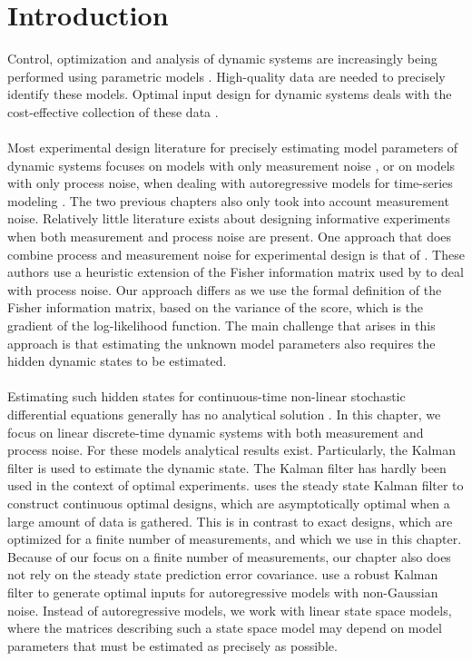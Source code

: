 \section{Introduction}
Control, optimization and analysis of dynamic systems are increasingly being performed using parametric models \parencite{findeisen}. High-quality data are needed to precisely identify these models. Optimal input design for dynamic systems deals with the cost-effective collection of these data \parencite{goodwin}.
\\
\\
{\color{red}Most experimental design literature for precisely estimating model parameters of dynamic systems focuses on models with only measurement noise \parencite{franceschini}, or on models with only process noise, when dealing with autoregressive models for time-series modeling \parencite{hjalmarsson,pintelon}. The two previous chapters also only took into account measurement noise. Relatively little literature exists about designing informative experiments when both measurement and process noise are present. One approach that does combine process and measurement noise for experimental design is that of \textcite{telen2}. These authors use a heuristic extension of the Fisher information matrix used by \textcite{franceschini} to deal with process noise. Our approach differs as we use the formal definition of the Fisher information matrix, based on the variance of the score, which is the gradient of the log-likelihood function. The main challenge that arises in this approach is that estimating the unknown model parameters also requires the hidden dynamic states to be estimated.}
\\
\\
Estimating such hidden states for continuous-time non-linear stochastic differential equations generally has no analytical solution \parencite{solin}. In this chapter, we focus on linear discrete-time dynamic systems with both measurement and process noise. For these models analytical results exist. Particularly, the Kalman filter is used to estimate the dynamic state. The Kalman filter has hardly been used in the context of optimal experiments. \textcite{titterington} uses the steady state Kalman filter to construct continuous optimal designs, which are asymptotically optimal when a large amount of data is gathered. This is in contrast to exact designs, which are optimized for a finite number of measurements, and which we use in this chapter. Because of our focus on a finite number of measurements, our chapter also does not rely on the steady state prediction error covariance. \textcite{stojanovic} use a robust Kalman filter to generate optimal inputs for autoregressive models with non-Gaussian noise. Instead of autoregressive models, we work with linear state space models, where the matrices describing such a state space model may depend on model parameters that must be estimated as precisely as possible.

